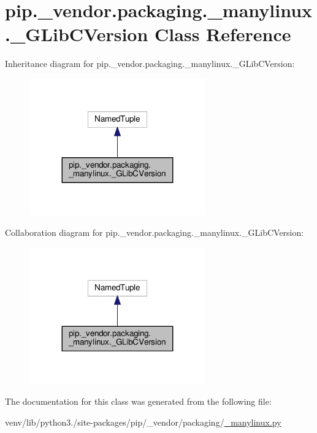 \hypertarget{classpip_1_1__vendor_1_1packaging_1_1__manylinux_1_1__GLibCVersion}{}\section{pip.\+\_\+vendor.\+packaging.\+\_\+manylinux.\+\_\+\+G\+Lib\+C\+Version Class Reference}
\label{classpip_1_1__vendor_1_1packaging_1_1__manylinux_1_1__GLibCVersion}


Inheritance diagram for pip.\+\_\+vendor.\+packaging.\+\_\+manylinux.\+\_\+\+G\+Lib\+C\+Version\+:
\nopagebreak
\begin{figure}[H]
\begin{center}
\leavevmode
\includegraphics[width=215pt]{classpip_1_1__vendor_1_1packaging_1_1__manylinux_1_1__GLibCVersion__inherit__graph}
\end{center}
\end{figure}


Collaboration diagram for pip.\+\_\+vendor.\+packaging.\+\_\+manylinux.\+\_\+\+G\+Lib\+C\+Version\+:
\nopagebreak
\begin{figure}[H]
\begin{center}
\leavevmode
\includegraphics[width=215pt]{classpip_1_1__vendor_1_1packaging_1_1__manylinux_1_1__GLibCVersion__coll__graph}
\end{center}
\end{figure}


The documentation for this class was generated from the following file\+:\begin{DoxyCompactItemize}
\item 
venv/lib/python3./site-\/packages/pip/\+\_\+vendor/packaging/\hyperlink{__manylinux_8py}{\+\_\+manylinux.\+py}\end{DoxyCompactItemize}
